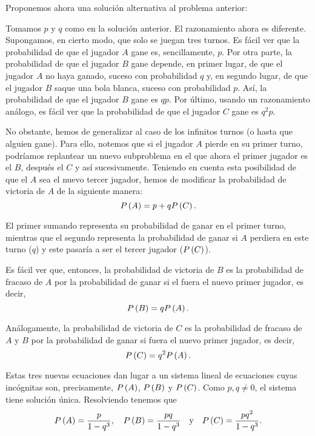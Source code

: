 Proponemos ahora una solución alternativa al problema anterior:

\begin{solution}
  Tomamos $p$ y $q$ como en la solución anterior. El razonamiento ahora es
  diferente. Supongamos, en cierto modo, que solo se juegan tres turnos. Es
  fácil ver que la probabilidad de que el jugador $A$ gane es,
  sencillamente, $p$. Por otra parte, la probabilidad de que el jugador $B$
  gane depende, en primer lugar, de que el jugador $A$ no haya ganado,
  suceso con probabilidad $q$ y, en segundo lugar, de que el jugador $B$
  saque una bola blanca, suceso con probabilidad $p$. Así, la probabilidad
  de que el jugador $B$ gane es $qp$. Por último, usando un razonamiento
  análogo, es fácil ver que la probabilidad de que el jugador $C$ gane es
  $q^2p$.

  No obstante, hemos de generalizar al caso de los infinitos turnos (o
  hasta que alguien gane). Para ello, notemos que si el jugador $A$ pierde
  en su primer turno, podríamos replantear un nuevo subproblema en el que
  ahora el primer jugador es el $B$, después el $C$ y así sucesivamente.
  Teniendo en cuenta esta posibilidad de que el $A$ sea el nuevo tercer
  jugador, hemos de modificar la probabilidad de victoria de $A$ de la
  siguiente manera:
  \[
    P\left(A\right) = p + qP\left(C\right).
  \]

  El primer sumando representa su probabilidad de ganar en el primer turno,
  mientras que el segundo representa la probabilidad de ganar si $A$
  perdiera en este turno ($q$) y este pasaría a ser el tercer jugador
  ($P\left(C\right)$).

  Es fácil ver que, entonces, la probabilidad de victoria de $B$ es la
  probabilidad de fracaso de $A$ por la probabilidad de ganar si el fuera
  el nuevo primer jugador, es decir,
  \[
    P\left(B\right) = qP\left(A\right).
  \]

  Análogamente, la probabilidad de victoria de $C$ es la probabilidad de
  fracaso de $A$ y $B$ por la probabilidad de ganar si fuera el nuevo
  primer jugador, es decir,
  \[
    P\left(C\right) = q^2P\left(A\right).
  \]

  Estas tres nuevas ecuaciones dan lugar a un sistema lineal de ecuaciones
  cuyas incógnitas son, precisamente, $P\left(A\right)$, $P\left(B\right)$ y $P\left(C\right)$.
  Como $p, q \neq 0$, el sistema tiene solución única. Resolviendo tenemos
  que
  \[
    P\left(A\right) = \frac{p}{1 - q^3}, \quad
    P\left(B\right) = \frac{pq}{1 - q^3} \quad \text{y} \quad
    P\left(C\right) = \frac{pq^2}{1 - q^3}.
  \]
\end{solution}

